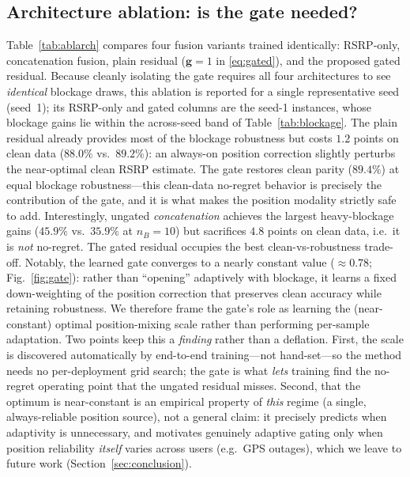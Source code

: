 \documentclass[conference]{IEEEtran}
\begin{document}
\subsection{Architecture ablation: is the gate needed?}
Table~\ref{tab:ablarch} compares four fusion variants trained identically:
RSRP-only, concatenation fusion, plain residual ($\mathbf{g}\!=\!1$ in
\eqref{eq:gated}), and the proposed gated residual. Because cleanly isolating the
gate requires all four architectures to see \emph{identical} blockage draws, this
ablation is reported for a single representative seed (seed~1); its RSRP-only and
gated columns are the seed-1 instances, whose blockage gains lie within the
across-seed band of Table~\ref{tab:blockage}. The plain residual already
provides most of the blockage robustness but costs $1.2$ points on clean data
($88.0\%$ vs.\ $89.2\%$): an always-on position correction slightly perturbs the
near-optimal clean RSRP estimate. The gate restores clean parity ($89.4\%$) at
equal blockage robustness---this clean-data no-regret behavior is precisely the
contribution of the gate, and it is what makes the position modality strictly
safe to add. Interestingly,
ungated \emph{concatenation} achieves the largest heavy-blockage gains
($45.9\%$ vs.\ $35.9\%$ at $n_B=10$) but sacrifices $4.8$ points on clean data,
i.e.\ it is \emph{not} no-regret. The gated residual occupies the best
clean-vs-robustness trade-off. Notably, the learned gate converges to a nearly
constant value ($\approx0.78$; Fig.~\ref{fig:gate}): rather than ``opening''
adaptively with blockage, it learns a fixed down-weighting of the position
correction that preserves clean accuracy while retaining robustness. We therefore
frame the gate's role as learning the (near-constant) optimal position-mixing
scale rather than performing per-sample adaptation. Two points keep this a
\emph{finding} rather than a deflation. First, the scale is discovered
automatically by end-to-end training---not hand-set---so the method needs no
per-deployment grid search; the gate is what \emph{lets} training find the
no-regret operating point that the ungated residual misses. Second, that the
optimum is near-constant is an empirical property of \emph{this} regime (a single,
always-reliable position source), not a general claim: it precisely predicts when
adaptivity is unnecessary, and motivates genuinely adaptive gating only when
position reliability \emph{itself} varies across users (e.g.\ GPS outages), which
we leave to future work (Section~\ref{sec:conclusion}).
\end{document}

